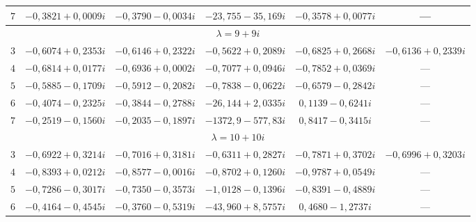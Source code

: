\begin{table}[b!]
\begin{minipage}[t]{135mm}
\begin{tabular}{c|c|c|c|c|c}
      \hline

      $7$&$-0{,}3821+0{,}0009i$&$-0{,}3790-0{,}0034i$&$-23{,}755-35{,}169i$&$-0{,}3578+0{,}0077i$&---\\

      \hline

      \multicolumn{6}{c}{$\lambda=9+9i$}\\

      \hline

      $3$&$-0{,}6074+0{,}2353i$&$-0{,}6146+0{,}2322i$&$-0{,}5622+0{,}2089i$&$-0{,}6825+0{,}2668i$&$-0{,}6136+0{,}2339i$\\

      \hline

      $4$&$-0{,}6814+0{,}0177i$&$-0{,}6936+0{,}0002i$&$-0{,}7077+0{,}0946i$&$-0{,}7852+0{,}0369i$&---\\

      \hline

      $5$&$-0{,}5885-0{,}1709i$&$-0{,}5912-0{,}2082i$&$-0{,}7838-0{,}0622i$&$-0{,}6579-0{,}2842i$&---\\

      \hline

      $6$&$-0{,}4074-0{,}2325i$&$-0{,}3844-0{,}2788i$&$-26{,}144+2{,}0335i$&$0{,}1139-0{,}6241i$&---\\

      \hline

      $7$&$-0{,}2519-0{,}1560i$&$-0{,}2035-0{,}1897i$&$-1372{,}9-577{,}83i$&$0{,}8417-0{,}3415i$&---\\

      \hline

      \multicolumn{6}{c}{$\lambda=10+10i$}\\

      \hline

      $3$&$-0{,}6922+0{,}3214i$&$-0{,}7016+0{,}3181i$&$-0{,}6311+0{,}2827i$&$-0{,}7871+0{,}3702i$&$-0{,}6996+0{,}3203i$\\

      \hline

      $4$&$-0{,}8393+0{,}0212i$&$-0{,}8577-0{,}0016i$&$-0{,}8702+0{,}1260i$&$-0{,}9787+0{,}0549i$&---\\

      \hline

      $5$&$-0{,}7286-0{,}3017i$&$-0{,}7350-0{,}3573i$&$-1{,}0128-0{,}1396i$&$-0{,}8391-0{,}4889i$&---\\

      \hline

      $6$&$-0{,}4164-0{,}4545i$&$-0{,}3760-0{,}5319i$&$-43{,}960+8{,}5757i$&$0{,}4680-1{,}2737i$&---\\


\end{tabular}
\end{minipage}
\end{table}
